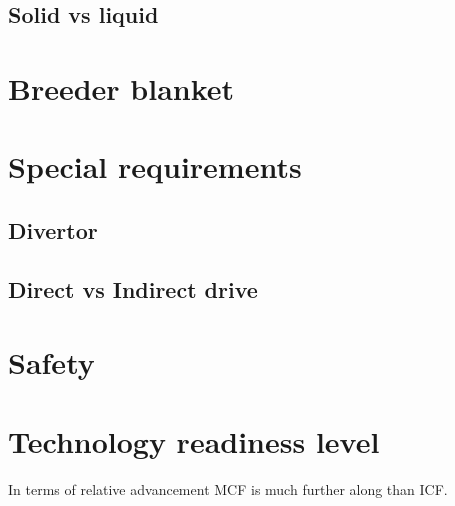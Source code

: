 \documentclass[12pt, a4paper]{article}
\begin{document}
		\subsection{Solid vs liquid}
	\section{Breeder blanket}
	\section{Special requirements}
		\subsection{Divertor}\label{ss:div}
		\subsection{Direct vs Indirect drive}
	\section{Safety}
	\section{Technology readiness level}
		In terms of relative advancement MCF is much further along than ICF.
\end{document}
